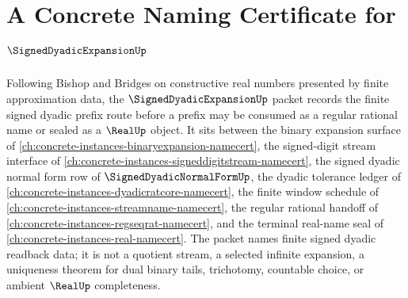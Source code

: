 \chapter{A Concrete Naming Certificate for $\SignedDyadicExpansionUp$}
\label{ch:concrete-instances-signed-dyadic-expansion-namecert}

Following Bishop and Bridges on constructive real numbers presented by finite approximation data, the $\SignedDyadicExpansionUp$ packet records the finite signed dyadic prefix route before a prefix may be consumed as a regular rational name or sealed as a $\RealUp$ object. It sits between the binary expansion surface of \autoref{ch:concrete-instances-binaryexpansion-namecert}, the signed-digit stream interface of \autoref{ch:concrete-instances-signeddigitstream-namecert}, the signed dyadic normal form row of $\SignedDyadicNormalFormUp$, the dyadic tolerance ledger of \autoref{ch:concrete-instances-dyadicratcore-namecert}, the finite window schedule of \autoref{ch:concrete-instances-streamname-namecert}, the regular rational handoff of \autoref{ch:concrete-instances-regseqrat-namecert}, and the terminal real-name seal of \autoref{ch:concrete-instances-real-namecert}. The packet names finite signed dyadic readback data; it is not a quotient stream, a selected infinite expansion, a uniqueness theorem for dual binary tails, trichotomy, countable choice, or ambient $\RealUp$ completeness.

